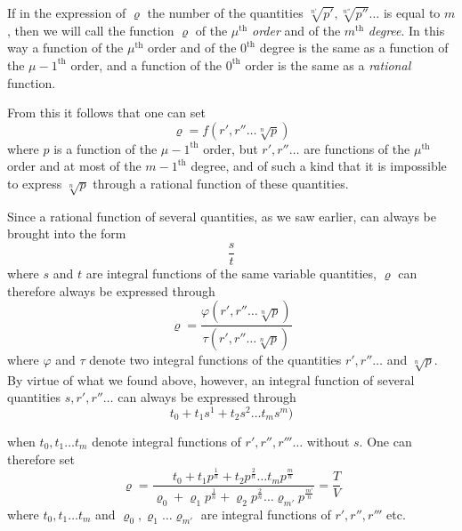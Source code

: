 \documentclass{article}
\begin{document}
If in the expression of $\varrho$ the number of the quantities $\sqrt[n']{p'}, \sqrt[n'']{p''} \ldots$ is equal to $m$, then we will call the function $\varrho$ of the $\mu^{\text{th}}$ \emph{order} and of the $m^{\text{th}}$ \emph{degree}. In this way a function of the $\mu^{\text{th}}$ order and of the $0^{\text{th}}$ degree is the same as a function of the $\mu - 1^{\text{th}}$ order, and a function of the $0^{\text{th}}$ order is the same as a \emph{rational} function.

From this it follows that one can set
\[ \varrho = f(r', r'' \ldots \sqrt[n]{p}) \]
where $p$ is a function of the $\mu - 1^{\text{th}}$ order, but $r', r'' \ldots$ are functions of the $\mu^{\text{th}}$ order and at most of the $m - 1^{\text{th}}$ degree, and of such a kind that it is impossible to express $\sqrt[n]{p}$ through a rational function of these quantities.

Since a rational function of several quantities, as we saw earlier, can always be brought into the form
\[ \frac{s}{t} \]
where $s$ and $t$ are integral functions of the same variable quantities, $\varrho$ can therefore always be expressed through
\[ \varrho = \frac{\varphi(r', r'' \ldots \sqrt[n]{p})}{\tau(r', r'' \ldots \sqrt[n]{p})} \]
where $\varphi$ and $\tau$ denote two integral functions of the quantities $r', r'' \ldots$ and $\sqrt[n]{p}$. By virtue of what we found above, however, an integral function of several quantities $s, r', r'' \ldots$ can always be expressed through
\[ t_0 + t_1 s^{1} + t_2 s^{2} \ldots t_m s^{m}) \]

when $t_0, t_1 \ldots t_m$ denote integral functions of $r', r'', r''' \ldots$ without $s$. One can therefore set
\[ \varrho = \frac{t_0 + t_1 p^{\frac{1}{n}} + t_2 p^{\frac{2}{n}} \ldots t_m p^{\frac{m}{n}}}{\varrho_0 + \varrho_1 p^{\frac{1}{n}} + \varrho_2 p^{\frac{2}{n}} \ldots \varrho_{m'} p^{\frac{m'}{n}}} = \frac{T}{V} \]
where $t_0, t_1 \ldots t_m$ and $\varrho_0, \varrho_1 \ldots \varrho_{m'}$ are integral functions of $r', r'', r''' $ etc.
\end{document}
